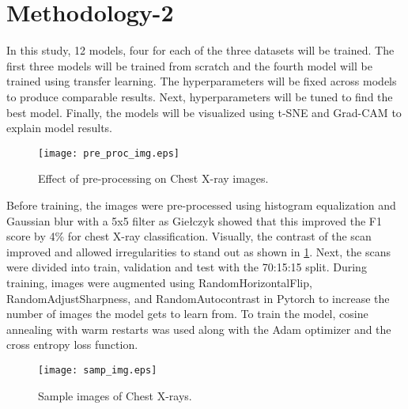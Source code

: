 \documentclass[10pt,twocolumn,letterpaper]{article}
\begin{document}
\section{Methodology-2}
\label{sec:prop_method}
In this study, 12 models, four for each of the three datasets will be trained. The first three models will be trained from scratch and the fourth model will be trained using transfer learning. The hyperparameters will be fixed across models to produce comparable results. Next, hyperparameters will be tuned to find the best model. Finally, the models will be visualized using t-SNE and Grad-CAM \cite{jacobgilpytorchcam} to explain model results. 
\begin{figure}[t]
  \centering
  \texttt{[image: pre\_proc\_img.eps]}  
   \caption{Effect of pre-processing on Chest X-ray images.}
   \vspace{-1em}
   \label{fig:pre_proc_img}
\end{figure}
Before training, the images were pre-processed using histogram equalization and Gaussian blur with a 5x5 filter as Giełczyk \etal \cite{gielczyk2022pre} showed that this improved the F1 score by 4\% for chest X-ray classification. Visually, the contrast of the scan improved and allowed irregularities to stand out as shown in \cref{fig:pre_proc_img}. Next, the scans were divided into train, validation and test with the 70:15:15 split. During training, images were augmented using RandomHorizontalFlip, RandomAdjustSharpness, and RandomAutocontrast in Pytorch \cite{transforms} to increase the number of images the model gets to learn from. To train the model, cosine annealing with warm restarts \cite{loshchilov2016sgdr} was used along with the Adam optimizer \cite{kingma2014adam} and the cross entropy loss function. 
\begin{figure}[t]
  \centering
  \texttt{[image: samp\_img.eps]}  
   \caption{Sample images of Chest X-rays.}
   \vspace{-0.5em}
   \label{fig:sample_img}
\end{figure}
\end{document}
